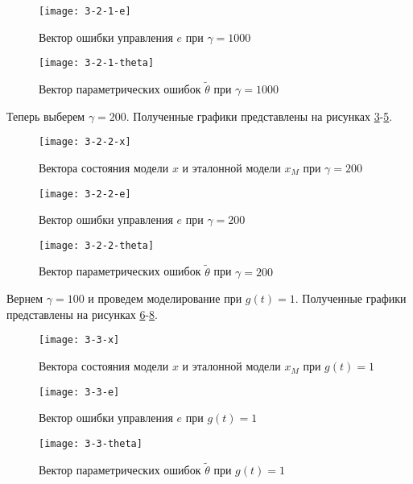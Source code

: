 \documentclass[14pt, a4paper]{extarticle}
\begin{document}
\begin{enumerate}
		\begin{figure}[H]
			\centering
			\texttt{[image: 3-2-1-e]}
			\caption{Вектор ошибки управления $e$ при $\gamma=1000$}
			\label{fig:3-2-1-e}
		\end{figure}
		
		\begin{figure}[H]
			\centering
			\texttt{[image: 3-2-1-theta]}
			\caption{Вектор параметрических ошибок $\tilde{\theta}$ при $\gamma=1000$}
			\label{fig:3-2-1-theta}
		\end{figure}
		
		Теперь выберем $\gamma=200$. Полученные графики представлены на рисунках \ref{fig:3-2-2-x}-\ref{fig:3-2-2-theta}.
		
		\begin{figure}[H]
			\centering
			\texttt{[image: 3-2-2-x]}
			\caption{Вектора состояния модели $x$ и эталонной модели $x_M$ при $\gamma=200$}
			\label{fig:3-2-2-x}
		\end{figure}
		
		\begin{figure}[H]
			\centering
			\texttt{[image: 3-2-2-e]}
			\caption{Вектор ошибки управления $e$ при $\gamma=200$}
			\label{fig:3-2-2-e}
		\end{figure}
		
		\begin{figure}[H]
			\centering
			\texttt{[image: 3-2-2-theta]}
			\caption{Вектор параметрических ошибок $\tilde{\theta}$ при $\gamma=200$}
			\label{fig:3-2-2-theta}
		\end{figure}
		
		Вернем $\gamma=100$ и проведем моделирование при $g(t)=1$. Полученные графики представлены на рисунках \ref{fig:3-3-x}-\ref{fig:3-3-theta}. 
		
		\begin{figure}[H]
			\centering
			\texttt{[image: 3-3-x]}
			\caption{Вектора состояния модели $x$ и эталонной модели $x_M$ при $g(t)=1$}
			\label{fig:3-3-x}
		\end{figure}
		
		\begin{figure}[H]
			\centering
			\texttt{[image: 3-3-e]}
			\caption{Вектор ошибки управления $e$ при $g(t)=1$}
			\label{fig:3-3-e}
		\end{figure}
		
		\begin{figure}[H]
			\centering
			\texttt{[image: 3-3-theta]}
			\caption{Вектор параметрических ошибок $\tilde{\theta}$ при $g(t)=1$}
			\label{fig:3-3-theta}
		\end{figure}
		
	\end{enumerate}
	
\end{document}
